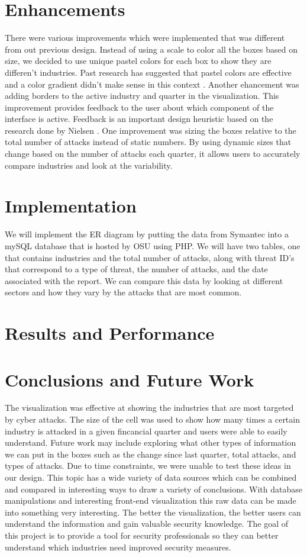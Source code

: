 \documentclass[journal]{vgtc}                %
\begin{document}
\section{Enhancements}
There were various improvements which were implemented that was different from out previous design. 
Instead of using a scale to color all the boxes based on size, we decided to use unique pastel colors for each box to show they are differen't industries. 
Past research has suggested that pastel colors are effective and a color gradient didn't make sense in this context \cite{S6}.
Another ehancement was adding borders to the active industry and quarter in the visualization. 
This improvement provides feedback to the user about which component of the interface is active. 
Feedback is an important design heuristic based on the research done by Nielsen \cite{S9}.
One improvement was sizing the boxes relative to the total number of attacks instead of static numbers. 
By using dynamic sizes that change based on the number of attacks each quarter,  it allows users to accurately compare industries and look at the variability.  

\section{Implementation}
We will implement the ER diagram by putting the data from Symantec into a mySQL database that is hosted by OSU using PHP.
We will have two tables, one that contains industries and the total number of attacks, along with threat ID’s that correspond to a type of threat, the number of attacks, and the date associated with the report. 
We can compare this data by looking at different sectors and how they vary by the attacks that are most common.

\section{Results and Performance}

\section{Conclusions and Future Work}
The visualization was effective at showing the industries that are most targeted by cyber attacks. 
The size of the cell was used to show how many times a certain industry is attacked in a given fincancial quarter and users were able to easily understand.
Future work may include exploring what other types of information we can put in the boxes such as the change since last quarter, total attacks, and types of attacks. 
Due to time constraints, we were unable to test these ideas in our design.
This topic has a wide variety of data sources which can be combined and compared in interesting ways to draw a variety of conclusions.
With database manipulations and interesting front-end visualization this raw data can be made into something very interesting.
The better the visualization, the better users can understand the information and gain valuable security knowledge.
The goal of this project is to provide a tool for security professionals so they can better understand which industries need improved security measures. 

%

%
%
%


\end{document}
